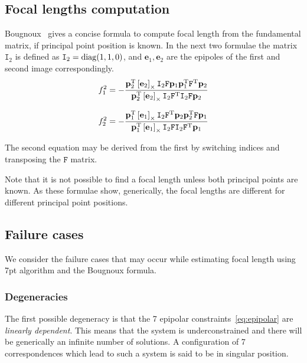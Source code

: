 \subsection{Focal lengths computation}
Bougnoux~\cite{Bougnoux} gives a concise formula to compute focal length from the fundamental matrix, if principal point position is known. In the next two formulae the matrix $\mathtt{I}_2$ is defined as $\mathtt{I}_2=\operatorname{diag}(1,1,0)$, and $\mathbf{e}_1, \mathbf{e}_2$ are the epipoles of the first and second image correspondingly. 
\begin{equation}
\label{eq:bougnoux1}
f^2_1=-\frac{\mathbf{p}^{\text{T}}_2 \left[\mathbf{e}_2\right]_\times \mathtt{I}_2 \mathtt{F} \mathbf{p}_1 \mathbf{p}^{\text{T}}_1 \mathtt{F}^{\text{T}} \mathbf{p}_2}{\mathbf{p}^{\text{T}}_2 \left[\mathbf{e}_2\right]_\times \mathtt{I}_2 \mathtt{F}^{\text{T}} \mathtt{I}_2 \mathtt{F} \mathbf{p}_2}
\end{equation}

\begin{equation}
\label{eq:bougnoux2}
f^2_2=-\frac{\mathbf{p}^{\text{T}}_1 \left[\mathbf{e}_1\right]_\times \mathtt{I}_2 \mathtt{F}^{\text{T}} \mathbf{p}_2 \mathbf{p}^{\text{T}}_2 \mathtt{F} \mathbf{p}_1}{\mathbf{p}^{\text{T}}_1 \left[\mathbf{e}_1\right]_\times \mathtt{I}_2 \mathtt{F} \mathtt{I}_2 \mathtt{F}^{\text{T}} \mathbf{p}_1}
\end{equation}

The second equation may be derived from the first by switching indices and transposing the $\mathtt{F}$ matrix. 

Note that it is not possible to find a focal length unless both principal points are known. As these formulae show, generically, the focal lengths are different for different principal point positions.

\subsection{Failure cases}
\label{seq:failure}
We consider the failure cases  that may occur while estimating focal length using 7pt algorithm and the Bougnoux formula.

\subsubsection{Degeneracies}
The first possible degeneracy is that the 7 epipolar constraints~\ref{eq:epipolar} are \textit{linearly dependent}. This means that the system is underconstrained and there will be generically an infinite number of solutions. A configuration of 7 correspondences which lead to such a system is said to be in singular position.

